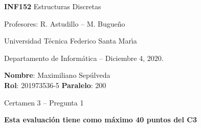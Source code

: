 \documentclass[legalpaper,10pt]{article}
\begin{document}
\thispagestyle{empty}

\begin{minipage}[t]{0.6\textwidth}

{\LARGE \textbf{INF152} Estructuras Discretas}

{\large Profesores: R. Astudillo -- M. Bugueño}

Universidad T\'ecnica Federico Santa Mar\'{\i}a

Departamento de Inform\'atica -- Diciembre 4, 2020.

\end{minipage}
\hfill
\begin{minipage}[t]{0.35\textwidth}
\textbf{Nombre}: Maximiliano Sepúlveda \\[0.3cm]
\textbf{Rol}: 201973536-5 \textbf{Paralelo}: 200
\end{minipage}

\vspace{0.8cm}

{\Large Certamen 3 -- Pregunta 1}

\vspace{0.4cm}

\textbf{Esta evaluación tiene como máximo 40 puntos del C3}
\end{document}
